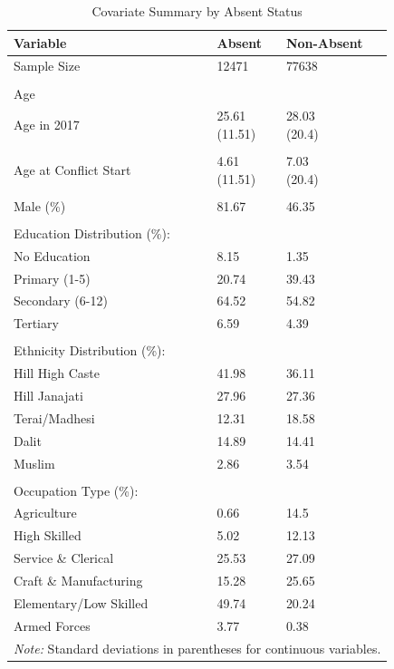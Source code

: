 \begin{table}[!h]
\centering
\caption{\label{tab:absent_summary}Covariate Summary by Absent Status}
\centering
\fontsize{10}{12}\selectfont
\begin{tabular}[t]{lll}
\toprule
Variable & Absent & Non-Absent\\
\midrule
Sample Size & 12471 & 77638\\
 &  & \\
Age &  & \\
Age in 2017 & \makecell[l]{25.61 \\ (11.51)} & \makecell[l]{28.03 \\ (20.4)}\\
 &  & \\
\addlinespace
Age at Conflict Start & \makecell[l]{4.61 \\ (11.51)} & \makecell[l]{7.03 \\ (20.4)}\\
 &  & \\
Male (\%) & 81.67 & 46.35\\
 &  & \\
Education Distribution (\%): &  & \\
\addlinespace
No Education & 8.15 & 1.35\\
Primary (1-5) & 20.74 & 39.43\\
Secondary (6-12) & 64.52 & 54.82\\
Tertiary & 6.59 & 4.39\\
 &  & \\
\addlinespace
Ethnicity Distribution (\%): &  & \\
Hill High Caste & 41.98 & 36.11\\
Hill Janajati & 27.96 & 27.36\\
Terai/Madhesi & 12.31 & 18.58\\
Dalit & 14.89 & 14.41\\
\addlinespace
Muslim & 2.86 & 3.54\\
 &  & \\
Occupation Type (\%): &  & \\
Agriculture & 0.66 & 14.5\\
High Skilled & 5.02 & 12.13\\
\addlinespace
Service \& Clerical & 25.53 & 27.09\\
Craft \& Manufacturing & 15.28 & 25.65\\
Elementary/Low Skilled & 49.74 & 20.24\\
Armed Forces & 3.77 & 0.38\\
\bottomrule
\multicolumn{3}{l}{\rule{0pt}{1em}\textit{Note: } Standard deviations in parentheses for continuous variables.}\\
\end{tabular}
\end{table}
